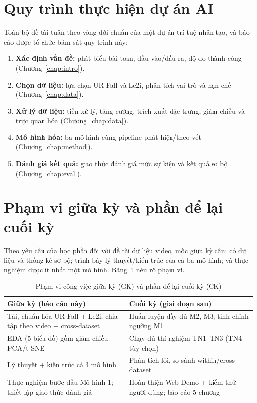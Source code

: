 \documentclass[fontsize=13pt,a4paper,oneside,DIV=calc,chapterprefix=true]{scrbook}
\begin{document}
\section{Quy trình thực hiện dự án AI}
Toàn bộ đề tài tuân theo vòng đời chuẩn của một dự án trí tuệ nhân tạo, và báo cáo được tổ chức bám sát quy trình này:
\begin{enumerate}[leftmargin=1.2cm]
    \item \textbf{Xác định vấn đề:} phát biểu bài toán, đầu vào/đầu ra, độ đo thành công (Chương~\ref{chap:intro}).
    \item \textbf{Chọn dữ liệu:} lựa chọn UR Fall và Le2i, phân tích vai trò và hạn chế (Chương~\ref{chap:data}).
    \item \textbf{Xử lý dữ liệu:} tiền xử lý, tăng cường, trích xuất đặc trưng, giảm chiều và trực quan hóa (Chương~\ref{chap:data}).
    \item \textbf{Mô hình hóa:} ba mô hình cùng pipeline phát hiện/theo vết (Chương~\ref{chap:method}).
    \item \textbf{Đánh giá kết quả:} giao thức đánh giá mức sự kiện và kết quả sơ bộ (Chương~\ref{chap:eval}).
\end{enumerate}

\section{Phạm vi giữa kỳ và phần để lại cuối kỳ}
Theo yêu cầu của học phần đối với đề tài dữ liệu video, mốc giữa kỳ cần: có dữ liệu và thống kê sơ bộ; trình bày lý thuyết/kiến trúc của cả ba mô hình; và thực nghiệm được ít nhất một mô hình. Bảng~\ref{tab:scope} nêu rõ phạm vi.

\begin{table}[H]
\centering
\caption{Phạm vi công việc giữa kỳ (GK) và phần để lại cuối kỳ (CK)}
\label{tab:scope}
\small
\begin{tabularx}{\linewidth}{@{}p{4.6cm}X@{}}
\toprule
\textbf{Giữa kỳ (báo cáo này)} & \textbf{Cuối kỳ (giai đoạn sau)} \\
\midrule
Tải, chuẩn hóa UR Fall + Le2i; chia tập theo video + cross-dataset & Huấn luyện đầy đủ M2, M3; tinh chỉnh ngưỡng M1 \\
EDA (5 biểu đồ) gồm giảm chiều PCA/t-SNE & Chạy đủ thí nghiệm TN1--TN3 (TN4 tùy chọn) \\
Lý thuyết + kiến trúc cả 3 mô hình & Phân tích lỗi, so sánh within/cross-dataset \\
Thực nghiệm bước đầu Mô hình 1; thiết lập giao thức đánh giá & Hoàn thiện Web Demo + kiểm thử người dùng; báo cáo 5 chương \\
\bottomrule
\end{tabularx}
\end{table}
\end{document}
